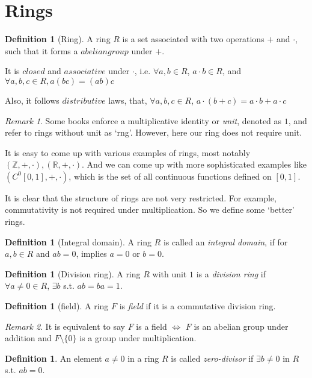 \documentclass{article}
\theoremstyle{definition}
\newtheorem{define}[thm]{Definition}
\theoremstyle{remark}
\newtheorem*{rmk}{Remark}
\begin{document}
\section{Rings}
\begin{define}[Ring]
  A ring $R$ is a set associated with two operations $+$ and $\cdot$, such that
  it forms a $abelian group$ under $+$. 

  It is $closed$ and $associative$ under $\cdot$, i.e. $\forall a,b \in R$, 
  $a \cdot b \in R$, and $\forall a,b,c \in R, a(bc) = (ab)c$

  Also, it follows $distributive$ laws, that, $\forall a,b,c \in R$, 
  $a\cdot(b+c) = a\cdot b + a\cdot c$
\end{define}
\begin{rmk}
  Some books enforce a multiplicative identity or {\it unit}, denoted as $1$, 
  and refer to rings without unit as `rng'. However, here our ring does not require
  unit.
\end{rmk}
It is easy to come up with various examples of rings, most notably 
$(\mathbb{Z}, +, \cdot), (\mathbb{R}, +, \cdot)$. And we can come up 
with more sophisticated examples like $(C^0[0,1], +, \cdot)$, which is 
the set of all continuous functions defined on $[0,1]$. 

It is clear that the structure of rings are not very restricted. 
For example, commutativity is not required under multiplication.
So we define some `better' rings.
\begin{define}[Integral domain]
  A ring $R$ is called an {\it integral domain}, if for $a, b \in R$ and $ab = 0$, 
  implies $a = 0$ or $b = 0$.
\end{define}

\begin{define}[Division ring]
  A ring $R$ with unit $1$ is a {\it division ring} if $\forall a \neq 0 \in R$, 
  $\exists b$ s.t. $ab = ba = 1$. 
\end{define}

\begin{define}[field]
  A ring $F$ is {\it field} if it is a commutative division ring.
\end{define}
\begin{rmk}
  It is equivalent to say $F$ is a field $\iff$ $F$ is an abelian group under addition
  and $F \setminus \{0\}$ is a group under multiplication.
\end{rmk}

\begin{define}
  An element $a \neq 0$ in a ring $R$ is called {\it zero-divisor} if $\exists b \neq 0$ in 
  $R$ s.t. $ab = 0$.
\end{define}
\end{document}

